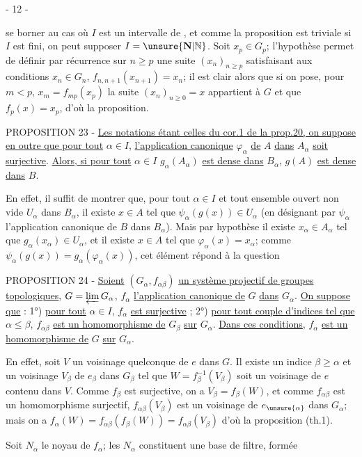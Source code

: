 \begin{center}- 12 -\end{center}

se borner au cas où $I$ est un intervalle de \qquad, et comme la proposition est triviale si $I$ est fini, on peut supposer $I=\unsure{\mathbf N|\mathbb N}$. Soit $x_p\in G_p$; l'hypothèse permet de définir par récurrence sur $n\geq p$ une suite $(x_n)_{n\geq p}$ satisfaisant aux conditions $x_n\in G_n$, $f_{n,n+1}(x_{n+1})=x_n$; il est clair alors que si on pose, pour $m<p$, $x_m=f_{mp}(x_p)$ la suite $(x_n)_{n\geq0}=x$ appartient à $G$ et que $f_p(x)=x_p$, d'où la proposition.

PROPOSITION 23 - \uline{Les notations étant celles du cor.1 de la prop.20, on suppose en outre que pour tout} $\alpha\in I$, \uline{l'application canonique} $\varphi_\alpha$ \uline{de} $A$ \uline{dans} $A_\alpha$ \uline{soit surjective}. \uline{Alors, si pour tout} $\alpha\in I$ $g_\alpha(A_\alpha)$ \uline{est dense dans} $B_\alpha$, $g(A)$ \uline{est dense dans} $B$.

En effet, il suffit de montrer que, pour tout $\alpha\in I$ et tout ensemble ouvert non vide $U_\alpha$ dans $B_\alpha$, il existe $x\in A$ tel que $\psi_\alpha(g(x))\in U_\alpha$ (en désignant par $\psi_\alpha$ l'application canonique de $B$ dans $B_\alpha$). Mais par hypothèse il existe $x_\alpha\in A_\alpha$ tel que $g_\alpha(x_\alpha)\in U_\alpha$, et il existe $x\in A$ tel que $\varphi_\alpha(x)=x_\alpha$; comme $\psi_\alpha(g(x))=g_\alpha(\varphi_\alpha(x))$, cet élément répond à la question

PROPOSITION 24 - \uline{Soient} $(G_\alpha,f_{\alpha\beta})$ \uline{un système projectif de groupes topologiques}, $G=\varprojlim G_\alpha$, $f_\alpha$ \uline{l'application canonique de} $G$ \uline{dans} $G_\alpha$. \uline{On suppose que} : 1°) \uline{pour tout} $\alpha\in I$, $f_\alpha$ \uline{est surjective} ; 2°) \uline{pour tout couple d'indices tel que} $\alpha\leq\beta$, $f_{\alpha\beta}$ \uline{est un homomorphisme de} $G_\beta$ \uline{sur} $G_\alpha$. \uline{Dans ces conditions}, $f_\alpha$ \uline{est un homomorphisme de} $G$ \uline{sur} $G_\alpha$.

En effet, soit $V$ un voisinage quelconque de $e$ dans $G$. Il existe un indice $\beta\geq\alpha$ et un voisinage $V_\beta$ de $e_\beta$ dans $G_\beta$ tel que $W=f_\beta^{-1}(V_\beta)$ soit un voisinage de $e$ contenu dans $V$. Comme $f_\beta$ est surjective, on a $V_\beta=f_\beta(W)$, et comme $f_{\alpha\beta}$ est un homomorphisme surjectif, $f_{\alpha\beta}(V_\beta)$ est un voisinage de $e_{\unsure{\alpha}}$ dans $G_\alpha$; mais on a $f_\alpha(W)=f_{\alpha\beta}(f_\beta(W))=f_{\alpha\beta}(V_\beta)$ d'où la proposition (th.1).

Soit $N_\alpha$ le noyau de $f_\alpha$; les $N_\alpha$ constituent une base de filtre, formée

